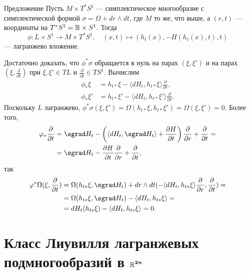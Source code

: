 \begin{thm*}{Предложение}
Пусть $M \times T^\ast S^1$ --- симплектическое многообразие с
симплектической формой $\sigma = \Omega + dr \wedge dt$, где $M$ то
же, что выше, а $(r, t)$ --- координаты на $T^\ast S^1 = \mathbb{R} \times
S^1$.  Тогда
\[\phi\colon L \times S^1 \to M \times T^\ast S^1,
\quad
(x, t) \mapsto (h_t (x), -H (h_t (x), t), t)\]
--- лагранжево вложение.
\end{thm*}

Достаточно доказать, что $\phi^\ast \sigma$ обращается в нуль на парах $(\xi, \xi')$ и на парах  $(\xi, \tfrac{\partial}{\partial t})$ при $\xi, \xi' \in T L$ и $\tfrac{\partial}{\partial t} \in T S^1$.
Вычислим 
\begin{align*}
\phi_\ast \xi
&= h_{t\ast} \xi - \langle dH_t, h_{t\ast} \xi\rangle
\frac{\partial}{\partial r},
\\
\phi_\ast \xi'
&= h_{t\ast} \xi' - \langle dH_t, h_{t\ast} \xi'\rangle
\frac{\partial}{\partial r}.
\end{align*}
Поскольку $L$ лагранжево, $\phi^\ast \sigma (\xi, \xi') = \Omega (h_{t\ast} \xi, h_{t\ast} \xi') = \Omega (\xi, \xi') = 0$.
Более того,
\begin{align*}
\phi_\ast\frac{\partial}{\partial t}
&= \sgrad H_t - 
\left( \langle dH_t, \sgrad H_t \rangle +\frac{\partial H}{\partial t}\right) \frac{\partial}{\partial r} +\frac{\partial}{\partial t}=
\\
&=\sgrad H_t - \frac{\partial H}{\partial t}\frac{\partial}{\partial r} +\frac{\partial}{\partial t},
\end{align*}
так 
\begin{align*}
\phi^\ast \Omega (\xi, \frac{\partial}{\partial t})
&= \Omega (h_{t\ast} \xi, \sgrad H_t) + dr \wedge dt (-\langle dH_t, h_{t\ast} \xi\rangle \frac{\partial}{\partial r},\frac{\partial}{\partial t}) =
\\
&=\Omega (h_{t\ast} \xi, \sgrad H_t) - \langle dH_t, h_{t\ast} \xi\rangle =
\\
&=dH_t (h_{t\ast} \xi) - \langle dH_t, h_{t\ast} \xi\rangle = 0.
\end{align*}
\qeds

\section[\texorpdfstring{Класс Лиувилля лагранжевых подмногообразий в $\RR^{2n}$}{Класс Лиувилля лагранжевых подмногообразий в ℝ²ⁿ}]{Класс Лиувилля лагранжевых подмногообразий в $\bm{\mathbb{R}^{2n}}$}

